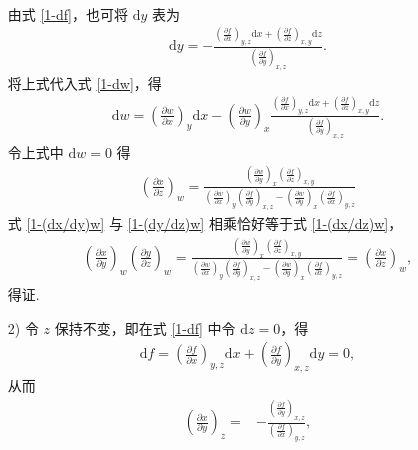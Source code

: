 \documentclass{assignment}
\begin{document}
\begin{pf}
\begin{itemize}
\begin{align}
        \end{align}
        由式 \eqref{1-df}，也可将 $\mathrm{d}y$ 表为
        \begin{align}
            \mathrm{d}y=-\frac{\left(\frac{\partial f}{\partial x}\right)_{y,z}\mathrm{d}x+\left(\frac{\partial f}{\partial z}\right)_{x,y}\mathrm{d}z}{\left(\frac{\partial f}{\partial y}\right)_{x,z}}.
        \end{align}
        将上式代入式 \eqref{1-dw}，得
        \begin{align}
            \mathrm{d}w=\left(\frac{\partial w}{\partial x}\right)_y\mathrm{d}x-\left(\frac{\partial w}{\partial y}\right)_x\frac{\left(\frac{\partial f}{\partial x}\right)_{y,z}\mathrm{d}x+\left(\frac{\partial f}{\partial z}\right)_{x,y}\mathrm{d}z}{\left(\frac{\partial f}{\partial y}\right)_{x,z}}.
        \end{align}
        令上式中 $\mathrm{d}w=0$ 得
        \begin{align}
            \label{1-(dx/dz)w}
            \left(\frac{\partial x}{\partial z}\right)_w=\frac{\left(\frac{\partial w}{\partial y}\right)_x\left(\frac{\partial f}{\partial z}\right)_{x,y}}{\left(\frac{\partial w}{\partial x}\right)_y\left(\frac{\partial f}{\partial y}\right)_{x,z}-\left(\frac{\partial w}{\partial y}\right)_x\left(\frac{\partial f}{\partial x}\right)_{y,z}}
        \end{align}
        式 \eqref{1-(dx/dy)w} 与 \eqref{1-(dy/dz)w} 相乘恰好等于式 \eqref{1-(dx/dz)w}，
        \begin{align}
            \left(\frac{\partial x}{\partial y}\right)_w\left(\frac{\partial y}{\partial z}\right)_w=\frac{\left(\frac{\partial w}{\partial y}\right)_x\left(\frac{\partial f}{\partial z}\right)_{x,y}}{\left(\frac{\partial w}{\partial x}\right)_y\left(\frac{\partial f}{\partial y}\right)_{x,z}-\left(\frac{\partial w}{\partial y}\right)_x\left(\frac{\partial f}{\partial x}\right)_{y,z}}=\left(\frac{\partial x}{\partial z}\right)_w,
        \end{align}
        得证.
        \item[2)] 令 $z$ 保持不变，即在式 \eqref{1-df} 中令 $\mathrm{d}z=0$，得
        \begin{align}
            \mathrm{d}f=\left(\frac{\partial f}{\partial x}\right)_{y,z}\mathrm{d}x+\left(\frac{\partial f}{\partial y}\right)_{x,z}\mathrm{d}y=0,
        \end{align}
        从而
        \begin{align}
            \label{1-dx/dy}
            \left(\frac{\partial x}{\partial y}\right)_z=&-\frac{\left(\frac{\partial f}{\partial y}\right)_{x,z}}{\left(\frac{\partial f}{\partial x}\right)_{y,z}},\\

\end{align}
\end{itemize}
\end{pf}
\end{document}
